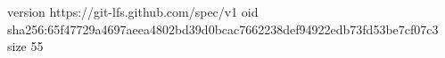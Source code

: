version https://git-lfs.github.com/spec/v1
oid sha256:65f47729a4697aeea4802bd39d0bcac7662238def94922edb73fd53be7cf07c3
size 55

